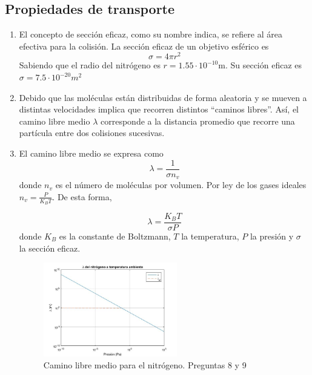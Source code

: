 \subsection{Propiedades de transporte}
\begin{enumerate}[resume]
\item %
El concepto de sección eficaz, como su nombre indica, se refiere al área efectiva para la colisión. La sección eficaz de un objetivo esférico es
\begin{equation}
    \sigma = 4 \pi r^2
\end{equation}
Sabiendo que el radio del nitrógeno es $r=1.55\cdot 10^{-10}$m. Su sección eficaz es $\sigma =7.5\cdot10^{-20} m^2$

\item %
Debido que las moléculas están distribuidas de forma aleatoria y se mueven a distintas velocidades implica que recorren distintos “caminos libres”.  Así, el camino libre medio  $\lambda$ corresponde a la distancia promedio que recorre una partícula entre dos colisiones sucesivas. 


\item %
El camino libre medio se expresa como
\begin{equation}
    \lambda =\frac{1}{ \sigma n_v} 
\end{equation}
donde $n_v$ es el número de moléculas por volumen. Por ley de los gases ideales $n_v = \frac{P}{K_BT}$. De esta forma, 

\begin{equation}
    \lambda = \frac{K_BT}{\sigma P }
\end{equation}
donde $K_B$ es la constante de Boltzmann, $T$ la temperatura, $P$ la presión y $\sigma$ la sección eficaz. 



\begin{figure}
    \centering
    \includegraphics[width=0.55\textwidth]{Imagenes/Unidad/U2/grafp8.jpg}
    \caption{Camino libre medio para el nitrógeno. Preguntas 8 y 9}
    \label{fig:my_label}
\end{figure}


\end{enumerate}
